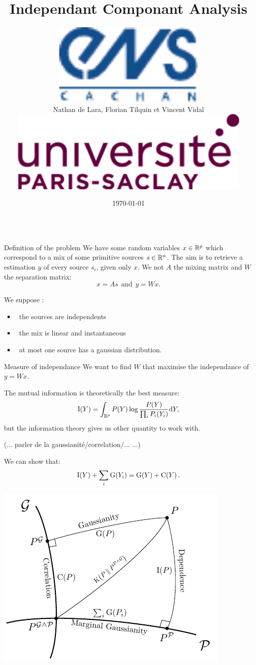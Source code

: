 \documentclass{beamer}
\title{Independant Componant Analysis}
\author[Lara, Tilquin, Vidal]
{
	\parbox{.25\textwidth}{\includegraphics[height=4cm]{ENS_cachan.pdf}}%
	\parbox{.5\textwidth}{\hfil \huge Nathan de Lara, Florian Tilquin et Vincent Vidal \hfil}%
	\parbox{.25\textwidth}{\hspace{8cm} \includegraphics[height=4cm]{UPS.png}}%
}
\institute[Université Paris-Saclay]{Master Mathématiques, Vision et Apprentissage, ENS Cachan}
\date{\today}
\newcommand{\zZ}[2]{\mathrm #1\!\zp{#2}}
\begin{document}
\begin{frame}{}
	\maketitle
\begin{columns}[T]
\begin{column}{.48\linewidth}


\begin{block}{Definition of the problem}
We have some random variables $x\in\mathbb{R}^p$ which correspond to
a mix of some primitive sources $s\in\mathbb{R}^n$. The aim is to retrieve a estimation $y$ of every source $s_i$, given only $x$. We not $A$ the mixing matrix and $W$ the separation matrix:
\begin{equation}
 x = A s \ \ \mbox{and} \ \ y = W x.
\end{equation}

We suppose :\begin{itemize}
\item \ the sources are independents
\item \ the mix is linear and instantaneous
\item \ at most one source has a gaussian distribution.  
\end{itemize}
\end{block}


\begin{block}{Measure of independance}
We want to find $W$ that maximise the independance of $y=Wx$.

The mutual information is theoretically the best measure:\begin{equation}
\zZ IY = \int_{\zR^p} P(Y) \log\frac{P(Y)}{\prod_i P_i(Y_i)} \zdx Y,
\end{equation}
but the information theory gives us other quantity to work with.

(... parler de la gaussianité/correlation/... ...)

We can show that:
\begin{equation}
        \zZ IY + \sum_i\zZ G{Y_i} = \zZ GY + \zZ CY.
\end{equation}


\begin{center}
  \includegraphics[width=.5\textwidth]{../figure_tikz/theory_info}
\end{center}


\end{block}
\end{column}
\end{columns}
\end{frame}
\end{document}
